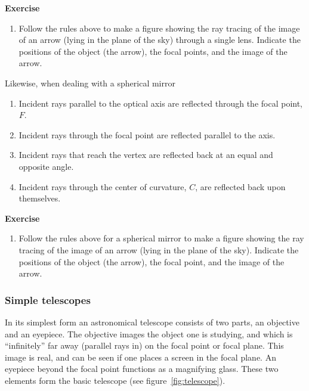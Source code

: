 {\bf Exercise}

\begin{enumerate}
\setcounter{enumi}{\value{count}}
\item Follow the rules above to make a figure showing the ray tracing
  of  the image of an arrow (lying in the plane of the sky) through a single lens. Indicate the
  positions of the object (the arrow), the focal points, and the image
  of the arrow.
\setcounter{count}{\value{enumi}} 
\end{enumerate}

Likewise, when dealing with a spherical mirror
\begin{enumerate}
\item Incident rays parallel to the optical axis are reflected through
  the focal point, $F$.
\item Incident rays through the focal point are reflected parallel to
  the axis.
\item Incident rays that reach the vertex are reflected back at an
  equal and opposite angle.
\item Incident rays through the center of curvature, $C$, are
  reflected back upon themselves.
\end{enumerate}

{\bf Exercise}

\begin{enumerate}
\setcounter{enumi}{\value{count}}
\item Follow the rules above for a spherical mirror to make a figure showing the ray tracing
  of  the image of an arrow (lying in the plane of the sky). Indicate the
  positions of the object (the arrow), the focal point, and the image
  of the arrow.
\setcounter{count}{\value{enumi}} 
\end{enumerate}

\subsubsection{Simple telescopes}

In its simplest form an astronomical telescope consists of two parts, an 
objective and an eyepiece. The objective images the object one is studying,
and which is ``infinitely'' far away (parallel rays in) on the focal point
or focal plane. This image is real, and can be seen if one places a screen 
in the focal plane. An eyepiece beyond the focal point functions as a 
magnifying glass. These two elements form the basic telescope (see figure~\ref{fig:telescope}).

